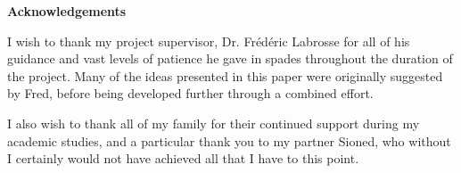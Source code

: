 \thispagestyle{empty}

\begin{center}
    {\LARGE\bf Acknowledgements}
\end{center}

I wish to thank my project supervisor, Dr. Fr\'{e}d\'{e}ric Labrosse for all of his guidance and vast levels of patience he gave in spades throughout the duration of the project. Many of the ideas presented in this paper were originally suggested by Fred, before being developed further through a combined effort. 

I also wish to thank all of my family for their continued support during my academic studies, and a particular thank you to my partner Sioned, who without I certainly would not have achieved all that I have to this point.